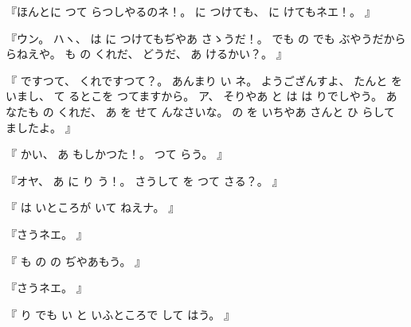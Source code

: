 %
『ほんとに
つて
らつしやるのネ！。
%
に
つけても、
%
に
けてもネエ！。
』

%
『ウン。
%
ハヽ、
%
は
に
つけてもぢやあ
さゝうだ！。
%
でも
の
でも
ぶやうだから
らねえや。
%
も
の
くれだ、
%
%
どうだ、
%
あ
けるかい？。
』

%
『
ですつて、
%
くれですつて？。
%
あんまり
い
ネ。
%
ようござんすよ、
%
たんと
を
いまし、
%
て
るとこを
つてますから。
%
ア、
%
そりやあ
と
は
は
りでしやう。
%
あなたも
の
くれだ、
%
あ
を
せて
んなさいな。
%
の
を
いちやあ
さんと
ひ
らして
ましたよ。
』

%
『
かい、
%
あ
もしかつた！。
%
つて
らう。
』

%
『オヤ、
%
あ
に
り
う！。
%
さうして
を
つて
さる？。
』

%
『
は%
いところが
いて
ねえナ。
』

%
『さうネエ。
』

%
『
も
の
の
ぢやあもう。
』

%
『さうネエ。
』

%
『
り
でも
い
と
いふところで
して%
はう。
』

